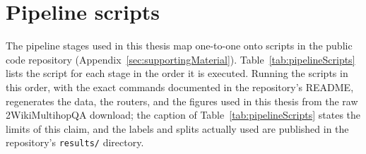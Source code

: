 \documentclass[english, bibtex]{kththesis}               %
\numberwithin{listing}{chapter}
\begin{document}
\clearpage
\section{Pipeline scripts}
\label{app:pipelineScripts}

The pipeline stages used in this thesis map one-to-one onto scripts in the public code repository (Appendix~\ref{sec:supportingMaterial}). Table~\ref{tab:pipelineScripts} lists the script for each stage in the order it is executed. Running the scripts in this order, with the exact commands documented in the repository's README, regenerates the data, the routers, and the figures used in this thesis from the raw 2WikiMultihopQA download; the caption of Table~\ref{tab:pipelineScripts} states the limits of this claim, and the labels and splits actually used are published in the repository's \texttt{results/} directory.
\end{document}
